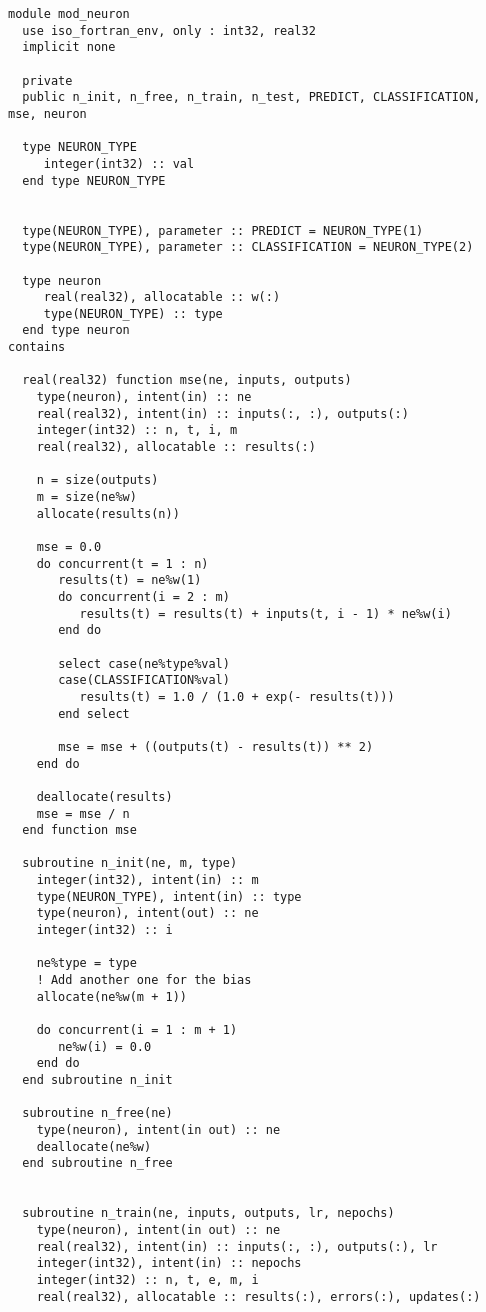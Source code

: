 \begin{lstlisting}
module mod_neuron
  use iso_fortran_env, only : int32, real32
  implicit none

  private
  public n_init, n_free, n_train, n_test, PREDICT, CLASSIFICATION, mse, neuron

  type NEURON_TYPE
     integer(int32) :: val
  end type NEURON_TYPE


  type(NEURON_TYPE), parameter :: PREDICT = NEURON_TYPE(1)
  type(NEURON_TYPE), parameter :: CLASSIFICATION = NEURON_TYPE(2)

  type neuron
     real(real32), allocatable :: w(:)
     type(NEURON_TYPE) :: type
  end type neuron
contains

  real(real32) function mse(ne, inputs, outputs)
    type(neuron), intent(in) :: ne
    real(real32), intent(in) :: inputs(:, :), outputs(:)
    integer(int32) :: n, t, i, m
    real(real32), allocatable :: results(:)

    n = size(outputs)
    m = size(ne%w)
    allocate(results(n))

    mse = 0.0
    do concurrent(t = 1 : n)
       results(t) = ne%w(1)
       do concurrent(i = 2 : m)
          results(t) = results(t) + inputs(t, i - 1) * ne%w(i)
       end do

       select case(ne%type%val)
       case(CLASSIFICATION%val)
          results(t) = 1.0 / (1.0 + exp(- results(t)))
       end select
       
       mse = mse + ((outputs(t) - results(t)) ** 2)
    end do
    
    deallocate(results)
    mse = mse / n
  end function mse

  subroutine n_init(ne, m, type)
    integer(int32), intent(in) :: m
    type(NEURON_TYPE), intent(in) :: type
    type(neuron), intent(out) :: ne
    integer(int32) :: i

    ne%type = type
    ! Add another one for the bias
    allocate(ne%w(m + 1))

    do concurrent(i = 1 : m + 1)
       ne%w(i) = 0.0
    end do
  end subroutine n_init

  subroutine n_free(ne)
    type(neuron), intent(in out) :: ne
    deallocate(ne%w)
  end subroutine n_free


  subroutine n_train(ne, inputs, outputs, lr, nepochs)
    type(neuron), intent(in out) :: ne
    real(real32), intent(in) :: inputs(:, :), outputs(:), lr
    integer(int32), intent(in) :: nepochs
    integer(int32) :: n, t, e, m, i
    real(real32), allocatable :: results(:), errors(:), updates(:)


\end{lstlisting}
